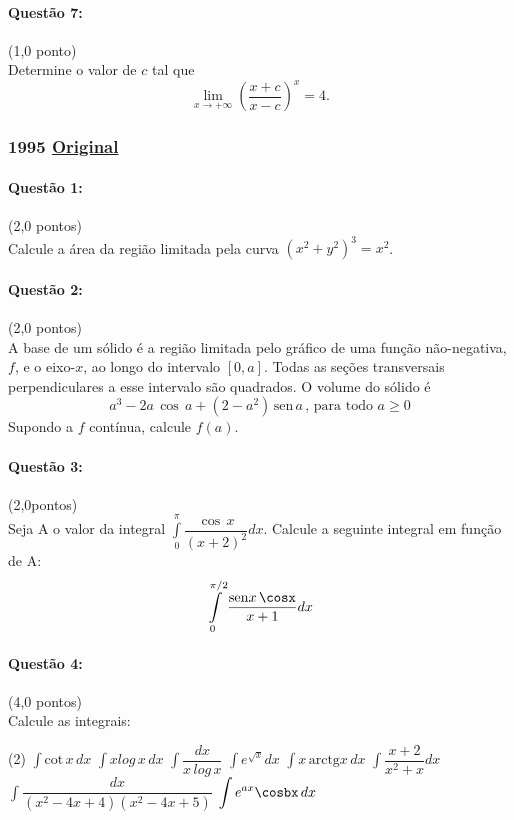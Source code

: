 \documentclass[12pt,a4paper]{article}
\newcommand{\original}[1]{\tiny \href{#1}{Original} \normalsize}
\begin{document}
\paragraph{Questão 7:}(1,0 ponto)\\
Determine o valor de $c$ tal que
$$\lim\limits_{x\to +\infty}\left(\dfrac{x+c}{x-c}\right)^x=4.$$


\newpage

\subsubsection{1995 \original{https://drive.google.com/open?id=1EltLvOHXbvCQv6Pj4VsqRM5YeL6tuSCs}}
\paragraph{Questão 1:}(2,0 pontos)\\
Calcule a área da região limitada pela curva $\left( x^2+y^2 \right)^3=x^2$.

\paragraph{Questão 2:}(2,0 pontos)\\
A base de um sólido é a região limitada pelo gráfico de uma função não-negativa, $f$, e o eixo-$x$, ao longo do intervalo $\left [ 0,a\right ]$. Todas as seções transversais perpendiculares a esse intervalo são quadrados. O volume do sólido é
$$a^3-2a\,\cos\,a+\left ( 2-a^2 \right )\,\mathrm{sen}\,a\,\text{, para todo } a\geq 0$$
Supondo a $f$ contínua, calcule $f(a)$.

\paragraph{Questão 3:}(2,0pontos)\\
Seja A o valor da integral $\displaystyle\int\limits_{0}^{\pi}\dfrac{\cos\,x}{(x+2)^2}dx$. Calcule a seguinte integral em função de A:
$$\displaystyle\int\limits_{0}^{\pi/2}\dfrac{\mathrm{sen}x\,\cosx}{x+1}dx$$

\paragraph{Questão 4:}(4,0 pontos)\\
Calcule as integrais:

\begin{tasks}(2)
\task $\displaystyle\int\mathrm{cot}\,x\,dx$
\task $\displaystyle\int xlog\,x\,dx$
\task $\displaystyle\int\dfrac{dx}{x\,log\,x}$
\task $\displaystyle\int e^{\sqrt{x}}dx$
\task $\displaystyle\int x\,\mathrm{arctg}x\,dx$
\task $\displaystyle\int\dfrac{x+2}{x^2+x}dx$
\task $\displaystyle\int\dfrac{dx}{\left ( x^2-4x+4\right )\left ( x^2-4x+5\right )}$
\task $\displaystyle\int e^{ax}\cosbx\,dx$
\end{tasks}
\end{document}
